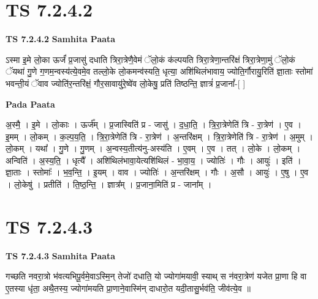 \documentclass[17pt]{extarticle}
\begin{document}

\section{ TS 7.2.4.2 }

\textbf{TS 7.2.4.2 } \newline
\textbf{Samhita Paata} \newline

ऽस्मा इ॒मे लो॒का ऊर्जं॑ प्र॒जासु॑ दधाति त्रिरा॒त्रेणै॒वेमं ॅलो॒कं क॑ल्पयति त्रिरा॒त्रेणा॒न्तरि॑क्षं त्रिरा॒त्रेणा॒मुं ॅलो॒कं ॅयथा॑ गु॒णे ग॒णम॒न्वस्य॑त्ये॒वमे॒व तल्लो॒के लो॒कमन्व॑स्यति॒ धृत्या॒ अशि॑थिलंभावाय॒ ज्योति॒र्गौरायु॒रिति॑ ज्ञा॒ताः स्तोमा॑ भवन्ती॒यं ॅवाव ज्योति॑र॒न्तरि॑क्षं॒ गौर॒सावायु॑रे॒ष्वे॑व लो॒केषु॒ प्रति॑ तिष्ठन्ति॒ ज्ञात्रं॑ प्र॒जानां᳚-[  ] \newline

\textbf{Pada Paata} \newline

अ॒स्मै॒ । इ॒मे । लो॒काः । ऊर्ज᳚म् । प्र॒जास्विति॑ प्र - जासु॑ । द॒धा॒ति॒ । त्रि॒रा॒त्रेणेति॑ त्रि - रा॒त्रेण॑ । ए॒व । इ॒मम् । लो॒कम् । क॒ल्प॒य॒ति॒ । त्रि॒रा॒त्रेणेति॑ त्रि - रा॒त्रेण॑ । अ॒न्तरि॑क्षम् । त्रि॒रा॒त्रेणेति॑ त्रि - रा॒त्रेण॑ । अ॒मुम् । लो॒कम् । यथा᳚ । गु॒णे । गु॒णम् । अ॒न्वस्य॒तीत्य॑नु-अस्य॑ति । ए॒वम् । ए॒व । तत् । लो॒के । लो॒कम् । अन्विति॑ । अ॒स्य॒ति॒ । धृत्यै᳚ । अशि॑थिलंभावा॒येत्यशि॑थिलं - भा॒वा॒य॒ । ज्योतिः॑ । गौः । आयुः॑ । इति॑ । ज्ञा॒ताः । स्तोमाः᳚ । भ॒व॒न्ति॒ । इ॒यम् । वाव । ज्योतिः॑ । अ॒न्तरि॑क्षम् । गौः । अ॒सौ । आयुः॑ । ए॒षु । ए॒व । लो॒केषु॑ । प्रतीति॑ । ति॒ष्ठ॒न्ति॒ । ज्ञात्र᳚म् । प्र॒जाना॒मिति॑ प्र - जाना᳚म् ।  \newline





\section{ TS 7.2.4.3 }

\textbf{TS 7.2.4.3 } \newline
\textbf{Samhita Paata} \newline

गच्छति नवरा॒त्रो भ॑वत्यभिपू॒र्वमे॒वाऽस्मि॒न् तेजो॑ दधाति॒ यो ज्योगा॑मयावी॒ स्याथ् स न॑वरा॒त्रेण॑ यजेत प्रा॒णा हि वा ए॒तस्या धृ॑ता॒ अथै॒तस्य॒ ज्योगा॑मयति प्रा॒णाने॒वास्मि॑न् दाधारो॒त यदी॒तासु॒र्भव॑ति॒ जीव॑त्ये॒व ॥ \newline
\end{document}
